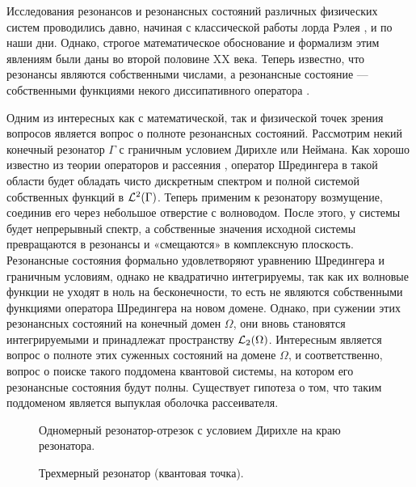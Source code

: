 \startprefacepage

Исследования резонансов и резонансных состояний различных физических систем проводились давно, начиная с классической работы лорда Рэлея \cite{rayleigh1916theory}, и по наши дни. Однако, строгое математическое обоснование и формализм этим явлениям были даны во второй половине XX века. Теперь известно, что резонансы являются собственными числами, а резонансные состояние — собственными функциями некого диссипативного оператора \cite{lax1990scattering, adamjan1965class}.

Одним из интересных как с математической, так и физической точек зрения вопросов является вопрос о полноте резонансных состояний. Рассмотрим некий конечный резонатор $\Gamma$ с граничным условием Дирихле или Неймана. Как хорошо известно из теории операторов и рассеяния \cite{reed1980methods}, оператор Шредингера в такой области будет обладать чисто дискретным спектром и полной системой собственных функций в $\mcL^2(\Gamma)$. Теперь применим к резонатору возмущение, соединив его через небольшое отверстие с волноводом. После этого, у системы будет непрерывный спектр, а собственные значения исходной системы превращаются в резонансы и «смещаются» в комплексную плоскость. Резонансные состояния формально удовлетворяют уравнению Шредингера и граничным условиям, однако не квадратично интегрируемы, так как их волновые функции не уходят в ноль на бесконечности, то есть не являются собственными функциями оператора Шредингера на новом домене. Однако, при сужении этих резонансных состояний на конечный домен $\Omega$, они вновь становятся интегрируемыми и принадлежат пространству $\mcL_2(\Omega)$. Интересным является вопрос о полноте этих суженных состояний на домене $\Omega$, и соответственно, вопрос о поиске такого поддомена квантовой системы, на котором его резонансные состояния будут полны. Существует гипотеза о том, что таким поддоменом является выпуклая оболочка рассеивателя.

\begin{figure}
\renewcommand\thefigure{А}
\centering
\begin{tikzpicture}[scale=1.1]

\end{tikzpicture}
\caption{Одномерный резонатор-отрезок с условием Дирихле на краю резонатора.} \label{fig:res_segment}
\end{figure}

\begin{figure}
\renewcommand\thefigure{Б}
\centering
\begin{tikzpicture}[scale=1.1]

\end{tikzpicture}
\caption{Трехмерный резонатор (квантовая точка).} \label{fig:res_3d}
\end{figure}

